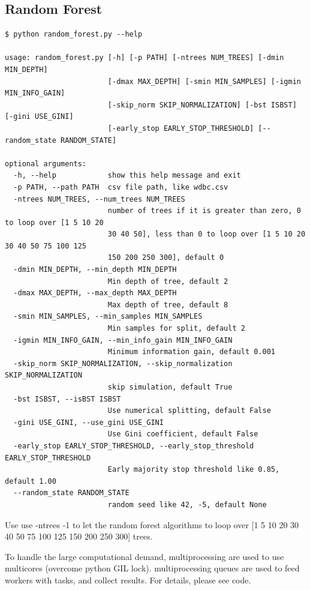 \subsection{Random Forest}

\begin{verbatim}
$ python random_forest.py --help

usage: random_forest.py [-h] [-p PATH] [-ntrees NUM_TREES] [-dmin MIN_DEPTH]
                        [-dmax MAX_DEPTH] [-smin MIN_SAMPLES] [-igmin MIN_INFO_GAIN]
                        [-skip_norm SKIP_NORMALIZATION] [-bst ISBST] [-gini USE_GINI]
                        [-early_stop EARLY_STOP_THRESHOLD] [--random_state RANDOM_STATE]

optional arguments:
  -h, --help            show this help message and exit
  -p PATH, --path PATH  csv file path, like wdbc.csv
  -ntrees NUM_TREES, --num_trees NUM_TREES
                        number of trees if it is greater than zero, 0 to loop over [1 5 10 20
                        30 40 50], less than 0 to loop over [1 5 10 20 30 40 50 75 100 125
                        150 200 250 300], default 0
  -dmin MIN_DEPTH, --min_depth MIN_DEPTH
                        Min depth of tree, default 2
  -dmax MAX_DEPTH, --max_depth MAX_DEPTH
                        Max depth of tree, default 8
  -smin MIN_SAMPLES, --min_samples MIN_SAMPLES
                        Min samples for split, default 2
  -igmin MIN_INFO_GAIN, --min_info_gain MIN_INFO_GAIN
                        Minimum information gain, default 0.001
  -skip_norm SKIP_NORMALIZATION, --skip_normalization SKIP_NORMALIZATION
                        skip simulation, default True
  -bst ISBST, --isBST ISBST
                        Use numerical splitting, default False
  -gini USE_GINI, --use_gini USE_GINI
                        Use Gini coefficient, default False
  -early_stop EARLY_STOP_THRESHOLD, --early_stop_threshold EARLY_STOP_THRESHOLD
                        Early majority stop threshold like 0.85, default 1.00
  --random_state RANDOM_STATE
                        random seed like 42, -5, default None
\end{verbatim}

Use use -ntrees -1 to let the random forest algorithms to loop over [1 5 10 20 30 40 50 75 100 125 150 200 250 300] trees.  

To handle the large computational demand, multiprocessing are used to use multicores (overcome python GIL lock). multiprocessing queues are used to feed workers with tasks, and collect results.  For details,  please see code.  


